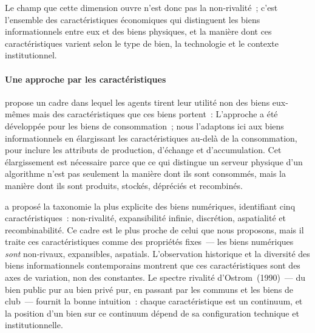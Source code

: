 Le champ que cette dimension ouvre n'est donc pas la non-rivalité~; c'est l'ensemble des caractéristiques économiques qui distinguent les biens informationnels entre eux et des biens physiques, et la manière dont ces caractéristiques varient selon le type de bien, la technologie et le contexte institutionnel.

\paragraph{Une approche par les caractéristiques}

\markNEO
\textcite{lancaster_new_1966} propose un cadre dans lequel les agents tirent leur utilité non des biens eux-mêmes mais des caractéristiques que ces biens portent~:  L'approche a été développée pour les biens de consommation~; nous l'adaptons ici aux biens informationnels en élargissant les caractéristiques au-delà de la consommation, pour inclure les attributs de production, d'échange et d'accumulation. Cet élargissement est nécessaire parce que ce qui distingue un serveur physique d'un algorithme n'est pas seulement la manière dont ils sont consommés, mais la manière dont ils sont produits, stockés, dépréciés et recombinés.

\textcite{quah_digital_2003} a proposé la taxonomie la plus explicite des biens numériques, identifiant cinq caractéristiques~: non-rivalité, expansibilité infinie, discrétion, aspatialité et recombinabilité. Ce cadre est le plus proche de celui que nous proposons, mais il traite ces caractéristiques comme des propriétés fixes~--- les biens numériques \emph{sont} non-rivaux, expansibles, aspatials. L'observation historique et la diversité des biens informationnels contemporains montrent que ces caractéristiques sont des axes de variation, non des constantes. Le spectre rivalité d'Ostrom~(1990)~--- du bien public pur au bien privé pur, en passant par les communs et les biens de club~--- fournit la bonne intuition~: chaque caractéristique est un continuum, et la position d'un bien sur ce continuum dépend de sa configuration technique et institutionnelle.

